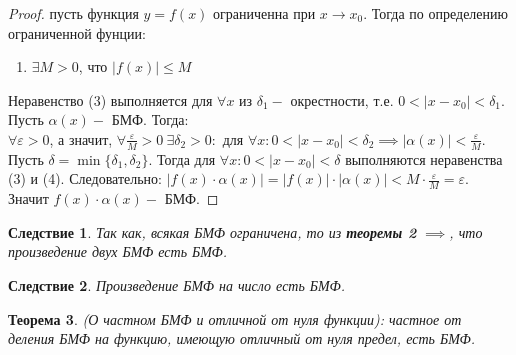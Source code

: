 \documentclass[12pt, a4paper]{article}
\newtheorem{theorem}{Теорема}[subsection]
\newtheorem{corollary}[theorem]{Следствие}
\theoremstyle{remark}
\newcommand{\Y}{\mathbb{\forall}}
\newcommand{\F}{\mathbb{\exists}}
\newcommand{\E}{\mathbb{\varepsilon}}
\begin{document}
	\begin{proof}
		пусть функция $y = f(x)$ ограниченна при $x \to x_0$. Тогда по определению ограниченной фунции:
		
		\begin{enumerate}[label=(\arabic*), start = 3]
			\item $\F M > 0$, что $|f(x)| \leq M$
		\end{enumerate}
		
		\noindent Неравенство (3) выполняется для $\Y x$ из $\delta_1 -$ окрестности, т.е. \(0 < |x - x_0| < \delta_1\).
		\\
		
		\noindent Пусть $\alpha(x) -$ БМФ. Тогда: \\ $\Y\E > 0$, а значит, $\Y\frac{\E}{M} > 0 \ \F\delta_2 > 0:$ для $\Y x: 0 < |x - x_0| < \delta_2 \implies |\alpha(x)| < \frac{\E}{M}$.
		\\
		
		\noindent Пусть \(\delta = \min\{\delta_1, \delta_2\}\). Тогда для $\Y x: 0 < |x - x_0| < \delta$ выполняются неравенства (3) и (4). Следовательно: $|f(x) \cdot \alpha(x)| = |f(x)| \cdot |\alpha(x)| < M \cdot \frac{\E}{M} = \E$. Значит $f(x) \cdot \alpha(x) -$ БМФ.
	\end{proof}
	
	\newpage
	
	\begin{corollary}
		Так как, всякая БМФ ограничена, то из \textbf{теоремы 2} $\implies$, что произведение двух БМФ есть БМФ.
	\end{corollary}
	
	\begin{corollary}
		Произведение БМФ на число есть БМФ.
	\end{corollary}
	
	\begin{theorem}
		(О частном БМФ и отличной от нуля функции): частное от деления БМФ на функцию, имеющую отличный от нуля предел, есть БМФ.
	\end{theorem}
	
\end{document}
